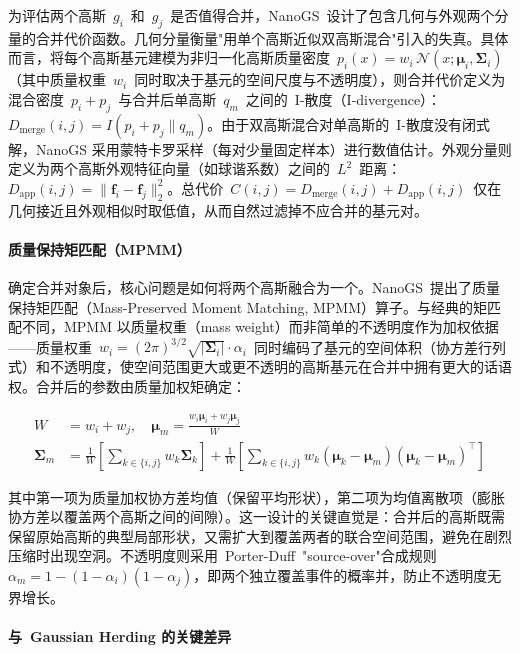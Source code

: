 为评估两个高斯~$g_i$~和~$g_j$~是否值得合并，NanoGS~设计了包含几何与外观两个分量的合并代价函数。几何分量衡量"用单个高斯近似双高斯混合"引入的失真。具体而言，将每个高斯基元建模为非归一化高斯质量密度~$p_i(x) = w_i \, \mathcal{N}(x; \boldsymbol{\mu}_i, \boldsymbol{\Sigma}_i)$（其中质量权重~$w_i$~同时取决于基元的空间尺度与不透明度），则合并代价定义为混合密度~$p_i + p_j$~与合并后单高斯~$q_m$~之间的~I-散度（I-divergence）：$D_{\text{merge}}(i,j) = I(p_i + p_j \| q_m)$。由于双高斯混合对单高斯的~I-散度没有闭式解，NanoGS 采用蒙特卡罗采样（每对少量固定样本）进行数值估计。外观分量则定义为两个高斯外观特征向量（如球谐系数）之间的~$L^2$~距离：$D_{\text{app}}(i,j) = \| \mathbf{f}_i - \mathbf{f}_j \|_2^2$。总代价~$C(i,j) = D_{\text{merge}}(i,j) + D_{\text{app}}(i,j)$~仅在几何接近且外观相似时取低值，从而自然过滤掉不应合并的基元对。

\paragraph{质量保持矩匹配（MPMM）}

确定合并对象后，核心问题是如何将两个高斯融合为一个。NanoGS~提出了质量保持矩匹配（Mass-Preserved Moment Matching, MPMM）算子。与经典的矩匹配不同，MPMM 以质量权重（mass weight）而非简单的不透明度作为加权依据——质量权重~$w_i = (2\pi)^{3/2} \sqrt{|\boldsymbol{\Sigma}_i|} \cdot \alpha_i$~同时编码了基元的空间体积（协方差行列式）和不透明度，使空间范围更大或更不透明的高斯基元在合并中拥有更大的话语权。合并后的参数由质量加权矩确定：

\begin{align}
W &= w_i + w_j, \quad \boldsymbol{\mu}_m = \frac{w_i \boldsymbol{\mu}_i + w_j \boldsymbol{\mu}_j}{W} \label{eq:ch11_nanogs_mean} \\
\boldsymbol{\Sigma}_m &= \frac{1}{W}\!\left[\sum_{k \in \{i,j\}} w_k \boldsymbol{\Sigma}_k\right] + \frac{1}{W}\!\left[\sum_{k \in \{i,j\}} w_k (\boldsymbol{\mu}_k - \boldsymbol{\mu}_m)(\boldsymbol{\mu}_k - \boldsymbol{\mu}_m)^\top\right] \label{eq:ch11_nanogs_cov}
\end{align}

其中第一项为质量加权协方差均值（保留平均形状），第二项为均值离散项（膨胀协方差以覆盖两个高斯之间的间隙）。这一设计的关键直觉是：合并后的高斯既需保留原始高斯的典型局部形状，又需扩大到覆盖两者的联合空间范围，避免在剧烈压缩时出现空洞。不透明度则采用~Porter-Duff~"source-over"合成规则~$\alpha_m = 1 - (1-\alpha_i)(1-\alpha_j)$，即两个独立覆盖事件的概率并，防止不透明度无界增长。

\paragraph{与~Gaussian Herding 的关键差异}

